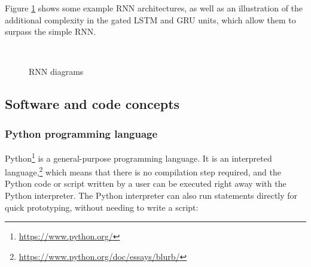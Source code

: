 \documentclass[report.tex]{subfiles}
\begin{document}
Figure \ref{fig:rnndiags} shows some example RNN architectures, as well as an illustration of the additional complexity in the gated LSTM and GRU units, which allow them to surpass the simple RNN.

\begin{figure}[ht]
	\centering
	\hspace{0.1em}
	\\
	\caption{RNN diagrams}
	\label{fig:rnndiags}
\end{figure}

\newpagefill

\subsection{Software and code concepts}
\label{sec:softcode}

\subsubsection{Python programming language}

Python\footnote{\url{https://www.python.org/}} is a general-purpose programming language. It is an interpreted language,\footnote{\url{https://www.python.org/doc/essays/blurb/}} which means that there is no compilation step required, and the Python code or script written by a user can be executed right away with the Python interpreter. The Python interpreter can also run statements directly for quick prototyping, without needing to write a script:
\end{document}

